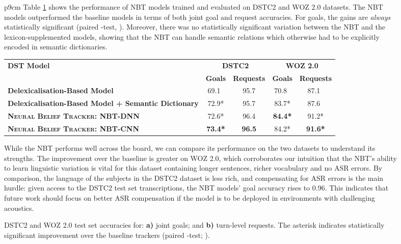 \documentclass[11pt,a4paper]{article}
\begin{document}
\begin{figure}
{\begin{tabular}{p{9cm}}
Table \ref{tab:dstc2_performance} shows the performance of NBT models trained and evaluated on DSTC2 and WOZ 2.0 datasets. The NBT models outperformed the baseline models in terms of both {joint goal} and request accuracies. For goals, the gains are \emph{always} statistically significant (paired -test, ). Moreover, there was no statistically significant variation between the NBT and the lexicon-supplemented models, showing that the NBT can handle semantic relations which otherwise had to be explicitly encoded in semantic dictionaries.

\begin{table*} [!t]
\centering

\begin{tabular}{l|cc|cc}
\multirow{2}{*}{\bf DST Model } & \multicolumn{2}{|c|}{\bf DSTC2} & \multicolumn{2}{|c}{\bf WOZ 2.0}  \\ 
                 & \bf Goals &  \bf Requests & \bf Goals & \bf Requests  \\ \hline
\bf Delexicalisation-Based Model &  69.1~    & 95.7 &  70.8~     &  87.1~    \\ 
\bf Delexicalisation-Based Model + Semantic Dictionary &  72.9* & 95.7 &   83.7* &  87.6~    \\ \hline
\bf \textsc{Neural Belief Tracker:} \textsc{NBT-DNN}      &  72.6* & 96.4 &  \bf 84.4* &  91.2* \\
\bf \textsc{Neural Belief Tracker:} \textsc{NBT-CNN}      &  \bf 73.4* & \bf 96.5 &  84.2* & \bf 91.6* \\ 
\end{tabular}\caption{DSTC2 and WOZ 2.0 test set accuracies for: \textbf{a)} joint goals; and \textbf{b)} turn-level requests. The asterisk indicates statistically significant improvement over the baseline trackers (paired -test; ).  \vspace{-1mm}   \label{tab:dstc2_performance}} 
\end{table*}

While the NBT performs well across the board, we can compare its performance on the two datasets to understand its strengths. The improvement over the baseline is greater on WOZ 2.0, which corroborates our intuition that the NBT's ability to learn linguistic variation is vital for this dataset containing longer sentences, richer vocabulary and no ASR errors. By comparison, the language of the subjects in the DSTC2 dataset is less rich, and compensating for ASR errors is the main hurdle: given access to the DSTC2 test set transcriptions, the NBT models' goal accuracy rises to 0.96. This indicates that future work should focus on better ASR compensation if the model is to be deployed in environments with challenging acoustics.



\end{tabular}}
\end{figure}
\end{document}
